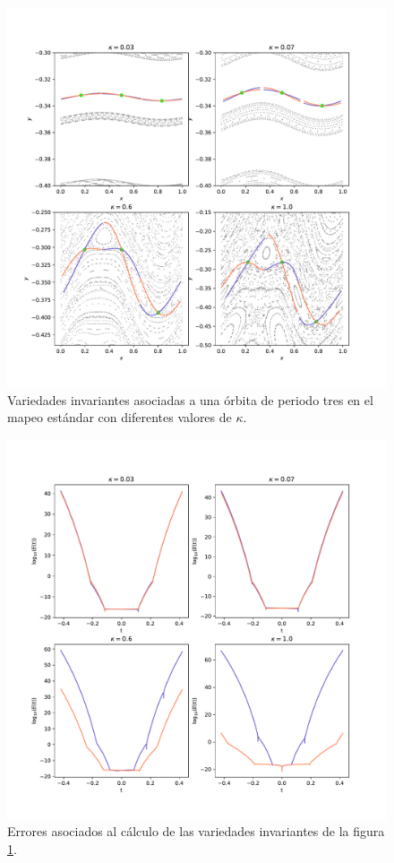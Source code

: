 \begin{figure}[H]
	\centering
	\includegraphics[scale=0.7]{variedadesestandarperiodo3}
	\caption{Variedades invariantes asociadas a una \'orbita de periodo tres en el mapeo est\'andar con diferentes valores de $\kappa$.}
	\label{variedadesestandarperiodo3}
\end{figure}
\begin{figure}[H]
	\centering
	\includegraphics[scale=0.7]{erroresvariedadesestandarperiodo3}
	\caption{Errores asociados al c\'alculo de las variedades invariantes de la figura \ref{variedadesestandarperiodo3}. }
	\label{erroresvariedadesperiodo3}
\end{figure}

